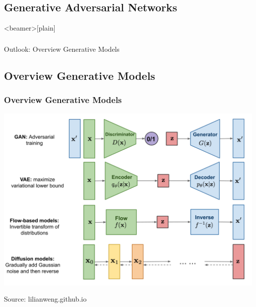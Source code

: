 \documentclass[13pt,compress]{beamer}
\begin{document}
\subsection*{Generative Adversarial Networks}

\begin{frame}<beamer>[plain]
    \frametitle{}
\begin{center}    
\Large{Outlook: Overview Generative Models}
\end{center}
  \end{frame}
\subsection*{Overview Generative Models}
\begin{frame}
    \frametitle{Overview Generative Models}
\includegraphics[width=\textwidth]{generative-overview.png}\\
\hfill \begin{tiny}
Source: lilianweng.github.io
\end{tiny}
  \end{frame}
\end{document}
